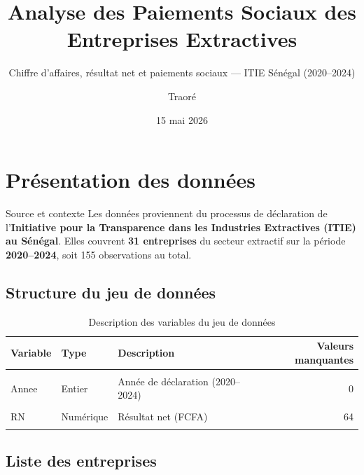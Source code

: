 \documentclass[
  12pt,
]{article}
\title{Analyse des Paiements Sociaux des Entreprises Extractives}
\subtitle{Chiffre d'affaires, résultat net et paiements sociaux --- ITIE Sénégal (2020--2024)}
\author{Traoré}
\date{15 mai 2026}
\begin{document}
\maketitle

{
\setcounter{tocdepth}{3}
\tableofcontents
}
\newpage

\section{Présentation des données}\label{pruxe9sentation-des-donnuxe9es}

\begin{boitedef}{Source et contexte}
Les données proviennent du processus de déclaration de l'\textbf{Initiative pour la Transparence dans les Industries Extractives (ITIE) au Sénégal}. Elles couvrent \textbf{31 entreprises} du secteur extractif sur la période \textbf{2020--2024}, soit 155 observations au total.
\end{boitedef}

\subsection{Structure du jeu de données}\label{structure-du-jeu-de-donnuxe9es}

\begin{table}[!h]
\centering
\caption{\label{tab:structure-table}Description des variables du jeu de données}
\centering
\begin{tabular}[t]{ll>{\raggedright\arraybackslash}p{7cm}r}
\toprule
Variable & Type & Description & Valeurs manquantes\\
\midrule
\cellcolor{gray!10}{Entreprise} & \cellcolor{gray!10}{Caractère} & \cellcolor{gray!10}{Nom de l'entreprise déclarante} & \cellcolor{gray!10}{0}\\
Annee & Entier & Année de déclaration (2020–2024) & 0\\
\cellcolor{gray!10}{CA} & \cellcolor{gray!10}{Numérique} & \cellcolor{gray!10}{Chiffre d'affaires (FCFA)} & \cellcolor{gray!10}{65}\\
RN & Numérique & Résultat net (FCFA) & 64\\
\cellcolor{gray!10}{Paiement} & \cellcolor{gray!10}{Numérique} & \cellcolor{gray!10}{Paiements sociaux déclarés à l'ITIE (FCFA)} & \cellcolor{gray!10}{155}\\
\bottomrule
\end{tabular}
\end{table}

\subsection{Liste des entreprises}\label{liste-des-entreprises}
\end{document}
